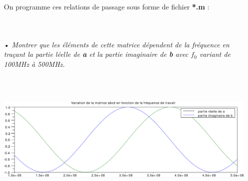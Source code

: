 \documentclass[10pt]{article}
\begin{document}
\begin{itemize}
        On programme ces relations de passage sous forme de fichier \textbf{*.m} :
        \inputminted[linenos]{matlab}{src/Z.m}
        \inputminted[linenos]{matlab}{src/z_normalise.m}
        \inputminted[linenos]{matlab}{src/S.m}


    \item[•] \textit{Montrer que les éléments de cette matrice dépendent de la fréquence en traçant la partie léelle de \textbf{a} et la partie imaginaire de \textbf{b} avec \textbf{$f_0$} variant de 100MHz à 500MHz.}

    \inputminted[linenos,lastline=20]{matlab}{src/BE.m}

    \includegraphics[width=\linewidth,height=6cm]{img/1a}

\end{itemize}
\end{document}
